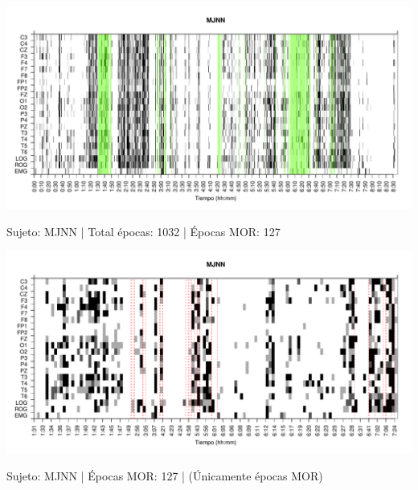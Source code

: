 
%
%


\begin{SidewaysFigure}
\centering
\includegraphics[width=\linewidth]
{./material_bonito170220/MJNNVIGILOS_127_mor127_tot1032_est_total.pdf} 
\caption{Sujeto: MJNN | Total \'epocas: 1032 | \'Epocas MOR: 127}
\end{SidewaysFigure}
\begin{SidewaysFigure}
\centering
\includegraphics[width=\linewidth]
{./material_bonito170220/MJNNVIGILOS_127_mor127_tot127_est_mor.pdf} 
\caption{Sujeto: MJNN | \'Epocas MOR: 127 | (\'Unicamente \'epocas MOR)}
\end{SidewaysFigure}

